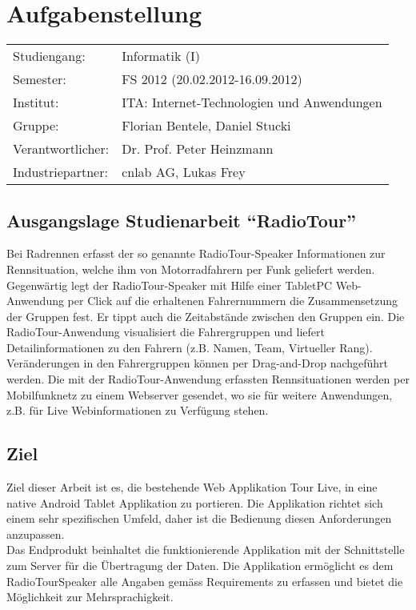 \chapter*{Aufgabenstellung}

\begin{tabular}{ll}
Studiengang: & Informatik (I)\\
Semester: & FS 2012 (20.02.2012-16.09.2012)\\
Institut: & ITA: Internet-Technologien und Anwendungen\\
Gruppe: & Florian Bentele, Daniel Stucki\\
Verantwortlicher: & Dr. Prof. Peter Heinzmann\\
Industriepartner: & cnlab AG, Lukas Frey

\end{tabular}

\section*{Ausgangslage Studienarbeit "`RadioTour"'}
Bei Radrennen erfasst der so genannte RadioTour-Speaker Informationen zur Rennsituation, welche ihm von Motorradfahrern per Funk geliefert werden. Gegenwärtig legt der RadioTour-Speaker mit Hilfe einer TabletPC Web-Anwendung per Click auf die erhaltenen Fahrernummern die Zusammensetzung der Gruppen fest. Er tippt auch die Zeitabstände zwischen den Gruppen ein. Die RadioTour-Anwendung  visualisiert die Fahrergruppen und liefert Detailinformationen zu den Fahrern (z.B. Namen, Team, Virtueller Rang). Veränderungen in den Fahrergruppen können per Drag-and-Drop nachgeführt werden. Die mit der RadioTour-Anwendung erfassten Rennsituationen werden per Mobilfunknetz zu einem Webserver gesendet, wo sie für weitere Anwendungen, z.B. für Live Webinformationen zu Verfügung stehen.

\section*{Ziel}
Ziel dieser Arbeit ist es, die bestehende Web Applikation Tour Live, in eine native Android Tablet Applikation zu portieren. Die Applikation richtet sich einem sehr spezifischen Umfeld, daher ist die Bedienung diesen Anforderungen anzupassen.
\\
Das Endprodukt beinhaltet die funktionierende Applikation mit der Schnittstelle zum Server für die Übertragung der Daten. Die Applikation ermöglicht es dem RadioTour\-Speaker alle Angaben gemäss Requirements zu erfassen und bietet die Möglichkeit zur Mehrsprachigkeit.

